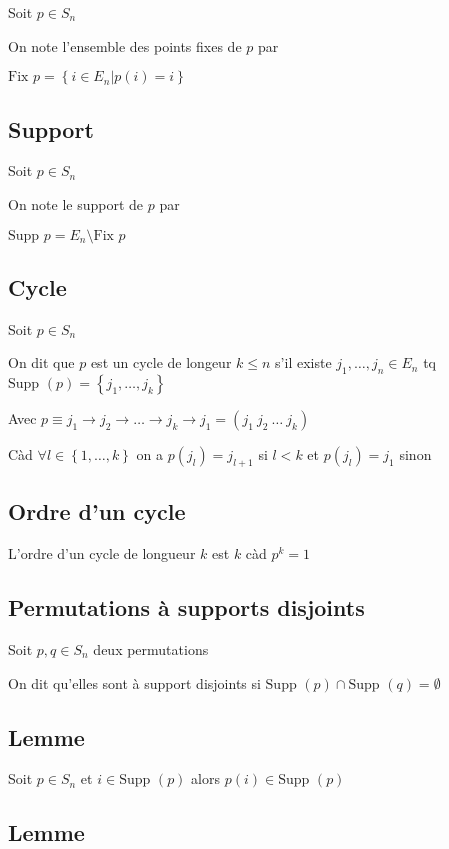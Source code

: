 \documentclass[a4paper,10pt]{article}
\newcommand{\Fix}{\mbox{Fix }}
\newcommand{\Supp}{\mbox{Supp }}
\newcommand{\but}{\setminus}
\newcommand{\ap}{\rightarrow}
\newcommand{\tset}[1]{\left\lbrace #1 \right\rbrace}
\begin{document}
Soit $p \in S_n$ 

On note l'ensemble des points fixes de $p$ par 

$\Fix p = \tset{i \in E_n \vert p(i) = i}$

\subsection{Support}

Soit $p \in S_n$

On note le support de $p$ par 

$\Supp p = E_n \but \Fix p$

\subsection{Cycle}

Soit $p \in S_n$ 

On dit que $p$ est un cycle de longeur $k \leq n$ s'il existe $j_1, \dots, j_n \in E_n$ tq $\Supp (p) = \tset{j_1, \dots , j_k}$ 

Avec $p \equiv j_1 \ap j_2 \ap \dots \ap j_k \ap j_1 = (j_1~j_2~\dots~j_k)$

Càd $\forall l \in \tset{1, \dots, k}$ on a $p(j_l) = j_{l+1}$ si $l < k$ et $p(j_l) = j_1$ sinon

\subsection{Ordre d'un cycle}


L'ordre d'un cycle de longueur $k$ est $k$ càd $p^k = 1$

\subsection{Permutations à supports disjoints}

Soit $p,q \in S_n$ deux permutations

On dit qu'elles sont à support disjoints si $\Supp(p) \cap \Supp(q) = \emptyset$

\subsection{Lemme}

Soit $p \in S_n$ et $i \in \Supp(p)$ alors $p(i) \in \Supp(p)$

\subsection{Lemme}
\end{document}
